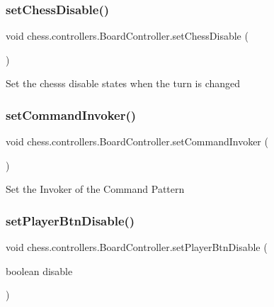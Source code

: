\subsubsection{\texorpdfstring{set\+Chess\+Disable()}{setChessDisable()}}
{\footnotesize\ttfamily void chess.\+controllers.\+Board\+Controller.\+set\+Chess\+Disable (\begin{DoxyParamCaption}{ }\end{DoxyParamCaption})}

Set the chess\textquotesingle{}s disable states when the turn is changed \mbox{\label{classchess_1_1controllers_1_1_board_controller_a4e6051a9cb52b74376bc36ce2e43951d}} 
\subsubsection{\texorpdfstring{set\+Command\+Invoker()}{setCommandInvoker()}}
{\footnotesize\ttfamily void chess.\+controllers.\+Board\+Controller.\+set\+Command\+Invoker (\begin{DoxyParamCaption}{ }\end{DoxyParamCaption})}

Set the Invoker of the Command Pattern \mbox{\label{classchess_1_1controllers_1_1_board_controller_a9d5d98fb3dcb39922e715a1182a4bd7c}} 
\subsubsection{\texorpdfstring{set\+Player\+Btn\+Disable()}{setPlayerBtnDisable()}}
{\footnotesize\ttfamily void chess.\+controllers.\+Board\+Controller.\+set\+Player\+Btn\+Disable (\begin{DoxyParamCaption}\item[{boolean}]{disable }\end{DoxyParamCaption})}

